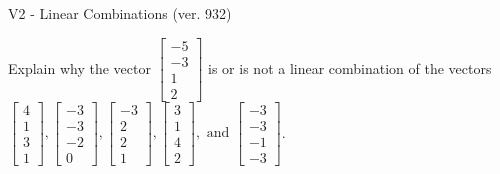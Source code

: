 \begin{exercise}
  \begin{exerciseTitle}V2 - Linear Combinations (ver. 932)\end{exerciseTitle}
  \begin{exerciseStatement}
    Explain why the vector \(\left[\begin{array}{c}
-5 \\
-3 \\
1 \\
2
\end{array}\right]\)  is or is not a linear 
	combination of the vectors \(\left[\begin{array}{c}
4 \\
1 \\
3 \\
1
\end{array}\right] , \left[\begin{array}{c}
-3 \\
-3 \\
-2 \\
0
\end{array}\right] , \left[\begin{array}{c}
-3 \\
2 \\
2 \\
1
\end{array}\right] , \left[\begin{array}{c}
3 \\
1 \\
4 \\
2
\end{array}\right] , \text{ and } \left[\begin{array}{c}
-3 \\
-3 \\
-1 \\
-3
\end{array}\right]\).
	



\end{exerciseStatement}
\end{exercise}
